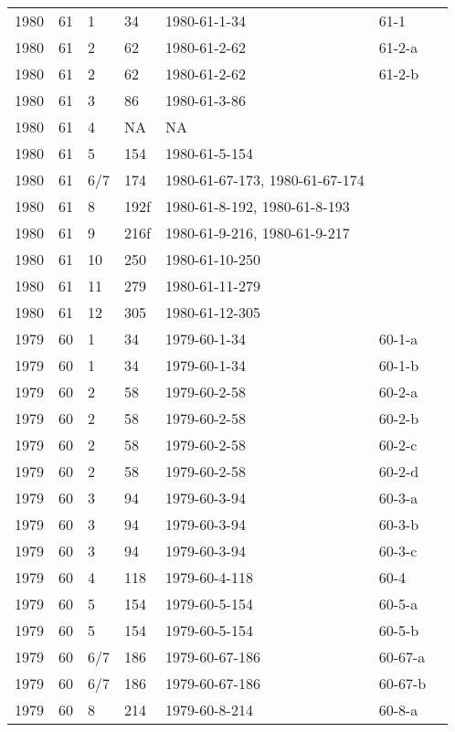 \begin{longtable}{ |l|l|l|l|p{2.7cm}|l|p{2cm}| }
 1980 & 61 &     1 &      34 &   1980-61-1-34 & 61-1 & \\
 1980 & 61 &     2 &      62 &   1980-61-2-62 & 61-2-a & \\
 1980 & 61 &     2 &      62 &   1980-61-2-62 & 61-2-b & \\
 1980 & 61 &     3 &      86 &   1980-61-3-86 &  & \\
 1980 & 61 &     4 &      NA &    NA          &  & \\
 1980 & 61 &     5 &     154 & 1980-61-5-154  &  & \\
 1980 & 61 &   6/7 &     174 & 1980-61-67-173, 1980-61-67-174 &  & \\
 1980 & 61 &     8 &    192f & 1980-61-8-192, 1980-61-8-193 &  & \\
 1980 & 61 &     9 &    216f & 1980-61-9-216, 1980-61-9-217 &  & \\
 1980 & 61 &    10 &     250 & 1980-61-10-250 &  & \\
 1980 & 61 &    11 &     279 & 1980-61-11-279 &  & \\
 1980 & 61 &    12 &     305 & 1980-61-12-305 &  & \\
 1979 & 60 &     1 &      34 & 1979-60-1-34   & 60-1-a & \\
 1979 & 60 &     1 &      34 & 1979-60-1-34   & 60-1-b & \\
 1979 & 60 &     2 &      58 & 1979-60-2-58   & 60-2-a & \\
 1979 & 60 &     2 &      58 & 1979-60-2-58   & 60-2-b & \\
 1979 & 60 &     2 &      58 & 1979-60-2-58   & 60-2-c & \\
 1979 & 60 &     2 &      58 & 1979-60-2-58   & 60-2-d & \\
 1979 & 60 &     3 &      94 & 1979-60-3-94   & 60-3-a & \\
 1979 & 60 &     3 &      94 & 1979-60-3-94   & 60-3-b & \\
 1979 & 60 &     3 &      94 & 1979-60-3-94   & 60-3-c & \\
 1979 & 60 &     4 &     118 & 1979-60-4-118  & 60-4 & \\
 1979 & 60 &     5 &     154 & 1979-60-5-154  & 60-5-a & \\
 1979 & 60 &     5 &     154 & 1979-60-5-154  & 60-5-b & \\
 1979 & 60 &   6/7 &     186 & 1979-60-67-186 & 60-67-a & \\
 1979 & 60 &   6/7 &     186 & 1979-60-67-186 & 60-67-b & \\
 1979 & 60 &     8 &     214 & 1979-60-8-214  & 60-8-a & \\

\end{longtable}
